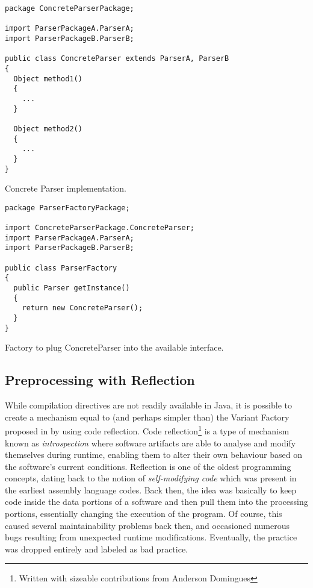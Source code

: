 \begin{listing}
\begin{verbatim}
package ConcreteParserPackage;

import ParserPackageA.ParserA;
import ParserPackageB.ParserB;

public class ConcreteParser extends ParserA, ParserB
{
  Object method1()
  {
    ...
  }

  Object method2()
  {
    ...
  }
}
\end{verbatim}
\caption{Concrete Parser implementation.} \label{lst:interfaceconcrete}
\end{listing}

\begin{listing}
\begin{verbatim}
package ParserFactoryPackage;

import ConcreteParserPackage.ConcreteParser;
import ParserPackageA.ParserA;
import ParserPackageB.ParserB;

public class ParserFactory
{
  public Parser getInstance()
  {
    return new ConcreteParser();
  }
}
\end{verbatim}
\caption{Factory to plug ConcreteParser into the available interface.} \label{lst:interfacefactory}
\end{listing}


\subsection{Preprocessing with Reflection}
\label{sc:reflection}

While compilation directives are not readily available in Java, it is possible to create a mechanism equal to (and perhaps simpler than) the Variant Factory proposed in \cite{LASER:2015} by using code reflection. Code reflection\footnote{Written with sizeable contributions from Anderson Domingues} is a type of mechanism known as \emph{introspection} where software artifacts are able to analyse and modify themselves during runtime, enabling them to alter their own behaviour based on the software's current conditions. Reflection is one of the oldest programming concepts, dating back to the notion of \emph{self-modifying code} which was present in the earliest assembly language codes. Back then, the idea was basically to keep code inside the data portions of a software and then pull them into the processing portions, essentially changing the execution of the program. Of course, this caused several maintainability problems back then, and occasioned numerous bugs resulting from unexpected runtime modifications. Eventually, the practice was dropped entirely and labeled as bad practice.

